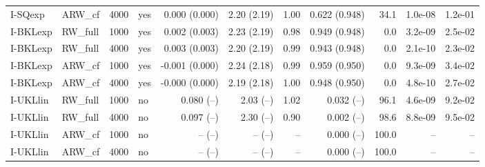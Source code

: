 \begin{tabular}{llrlrrrrrrr}
I-SQexp & ARW\_cf & 4000 & yes & 0.000 (0.000) & 2.20 (2.19) & 1.00 & 0.622 (0.948) & 34.1 & 1.0e-08 & 1.2e-01 \\
I-BKLexp & RW\_full & 1000 & yes & 0.002 (0.003) & 2.23 (2.19) & 0.98 & 0.949 (0.948) & 0.0 & 3.2e-09 & 2.5e-02 \\
I-BKLexp & RW\_full & 4000 & yes & 0.003 (0.003) & 2.20 (2.19) & 0.99 & 0.943 (0.948) & 0.0 & 2.1e-10 & 2.3e-02 \\
I-BKLexp & ARW\_cf & 1000 & yes & -0.001 (0.000) & 2.24 (2.18) & 0.99 & 0.959 (0.950) & 0.0 & 9.3e-09 & 3.4e-02 \\
I-BKLexp & ARW\_cf & 4000 & yes & -0.000 (0.000) & 2.19 (2.18) & 1.00 & 0.948 (0.950) & 0.0 & 4.8e-10 & 2.7e-02 \\
I-UKLlin & RW\_full & 1000 & no & 0.080 (--) & 2.03 (--) & 1.02 & 0.032 (--) & 96.1 & 4.6e-09 & 9.2e-02 \\
I-UKLlin & RW\_full & 4000 & no & 0.097 (--) & 2.30 (--) & 0.90 & 0.002 (--) & 98.6 & 8.8e-09 & 9.5e-02 \\
I-UKLlin & ARW\_cf & 1000 & no & -- (--) & -- (--) & -- & 0.000 (--) & 100.0 & -- & -- \\
I-UKLlin & ARW\_cf & 4000 & no & -- (--) & -- (--) & -- & 0.000 (--) & 100.0 & -- & -- \\
\hline
\end{tabular}
